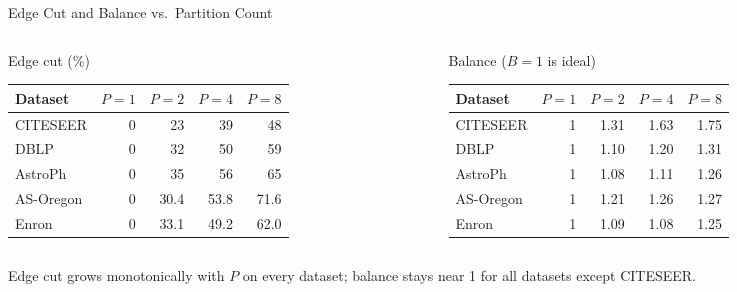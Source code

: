 \documentclass[aspectratio=169]{beamer}
\begin{document}
\begin{frame}{Edge Cut and Balance vs.\ Partition Count}
  \begin{columns}
    \begin{column}{0.48\textwidth}
      \centering
      \small Edge cut (\%)
      \begin{tabular}{lrrrr}
        \toprule
        Dataset & $P{=}1$ & $P{=}2$ & $P{=}4$ & $P{=}8$ \\
        \midrule
        CITESEER  & 0 & 23 & 39 & 48 \\
        DBLP      & 0 & 32 & 50 & 59 \\
        AstroPh   & 0 & 35 & 56 & 65 \\
        AS-Oregon & 0 & 30.4 & 53.8 & 71.6 \\
        Enron     & 0 & 33.1 & 49.2 & 62.0 \\
        \bottomrule
      \end{tabular}
    \end{column}
    \begin{column}{0.48\textwidth}
      \centering
      \small Balance ($B{=}1$ is ideal)
      \begin{tabular}{lrrrr}
        \toprule
        Dataset & $P{=}1$ & $P{=}2$ & $P{=}4$ & $P{=}8$ \\
        \midrule
        CITESEER  & 1 & 1.31 & 1.63 & 1.75 \\
        DBLP      & 1 & 1.10 & 1.20 & 1.31 \\
        AstroPh   & 1 & 1.08 & 1.11 & 1.26 \\
        AS-Oregon & 1 & 1.21 & 1.26 & 1.27 \\
        Enron     & 1 & 1.09 & 1.08 & 1.25 \\
        \bottomrule
      \end{tabular}
    \end{column}
  \end{columns}
  \vspace{1em}
  \small Edge cut grows monotonically with $P$ on every dataset; balance stays near 1 for all datasets except CITESEER.
\end{frame}
\end{document}
